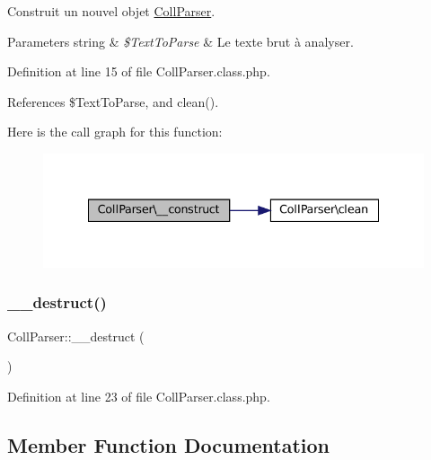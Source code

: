Construit un nouvel objet \hyperlink{class_coll_parser}{Coll\+Parser}.


\begin{DoxyParams}[1]{Parameters}
string & {\em \$\+Text\+To\+Parse} & Le texte brut à analyser. \\
\hline
\end{DoxyParams}


Definition at line 15 of file Coll\+Parser.\+class.\+php.



References \$\+Text\+To\+Parse, and clean().

Here is the call graph for this function\+:\nopagebreak
\begin{figure}[H]
\begin{center}
\leavevmode
\includegraphics[width=335pt]{class_coll_parser_a0642e6816338ececb86de51a3458a2a9_cgraph}
\end{center}
\end{figure}
\mbox{\label{class_coll_parser_a247899e603dc8e17fb15060498eadcca}} 
\subsubsection{\texorpdfstring{\+\_\+\+\_\+destruct()}{\_\_destruct()}}
{\footnotesize\ttfamily Coll\+Parser\+::\+\_\+\+\_\+destruct (\begin{DoxyParamCaption}{ }\end{DoxyParamCaption})}



Definition at line 23 of file Coll\+Parser.\+class.\+php.



\subsection{Member Function Documentation}
\mbox{\label{class_coll_parser_a66f8bad86783c3224b7e94f5736f691e}} 
